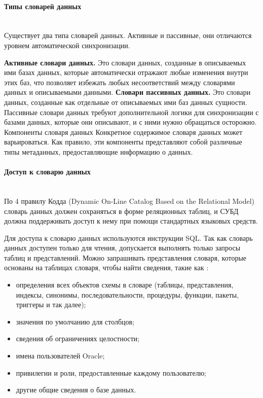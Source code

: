 \paragraph{Типы словарей данных} ~\\

Существует два типа словарей данных. Активные и пассивные, они отличаются уровнем автоматической синхронизации.

\textbf{Активные словари данных.} Это словари данных, созданные в описываемых ими базах данных, которые автоматически отражают любые изменения внутри этих баз, что позволяет избежать любых несоответствий между словарями данных и описываемыми данными.
\textbf{Словари пассивных данных.} Это словари данных, созданные как отдельные от описываемых ими баз данных сущности. Пассивные словари данных требуют дополнительной логики для синхронизации с базами данных, которые они описывают, и с ними нужно обращаться осторожно.
Компоненты словаря данных
Конкретное содержимое словаря данных может варьироваться. Как правило, эти компоненты представляют собой различные типы метаданных, предоставляющие информацию о данных. \autocite{DataDictionary}

\paragraph{Доступ к словарю данных} ~\\

По 4 правилу Кодда (Dynamic On-Line Catalog Based on the Relational Model) словарь данных должен сохраняться в форме реляционных
таблиц, и СУБД должна поддерживать доступ к нему при
помощи стандартных языковых средств.

Для доступа к словарю данных используются инструкции SQL. Так как словарь данных доступен только для чтения, допускается выполнять только запросы таблиц и представлений.
Можно запрашивать представления словаря, которые основаны на таблицах словаря, чтобы найти сведения, такие как \autocite{Oracle}:
\begin{itemize}
\item определения всех объектов схемы в словаре (таблицы, представления, индексы, синонимы, последовательности, процедуры, функции, пакеты, триггеры и так далее);
\item значения по умолчанию для столбцов;
\item сведения об ограничениях целостности;
\item имена пользователей Oracle;
\item привилегии и роли, предоставленные каждому пользователю;
\item другие общие сведения о базе данных.
\end{itemize}

